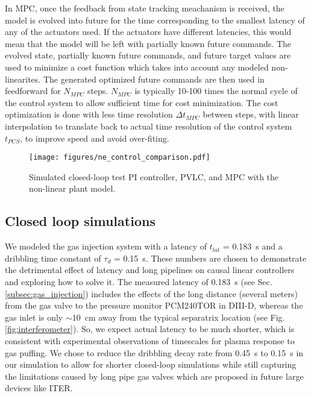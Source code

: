 In \ac{MPC}, once the feedback from state tracking meachanism is received, the model is evolved into future for the time corresponding to the smallest latency of any of the actuators used. If the actuators have different latencies, this would mean that the model will be left with partially known future commands. The evolved state, partially known future commands, and future target values are used to minimize a cost function which takes into account any modeled non-linearites. The generated optimized future commands are then used in feedforward for $N_{MPC}$ steps. $N_{MPC}$ is typically 10-100 times the normal cycle of the control system to allow sufficient time for cost minimization. The cost optimization is done with less time resolution $\Delta t_{MPC}$ between steps, with linear interpolation to translate back to actual time resolution of the control system $t_{PCS}$, to improve speed and avoid over-fiting.


\begin{figure}[!h]
 \centering
 \texttt{[image: figures/ne\_control\_comparison.pdf]}
 \caption{Simulated closed-loop test PI controller, \ac{PVLC}, and \ac{MPC} with the non-linear plant model.}
 \label{fig:mpc_test}
\end{figure}

\subsection{Closed loop simulations}{\label{subssec:closed-loop_sims}}

We modeled the gas injection system with a latency of $t_{lat}$ = 0.183~s and a dribbling time constant of $\tau_d$ = 0.15~s. These numbers are chosen to demonstrate the detrimental effect of latency and long pipelines on causal linear controllers and exploring how to solve it. The measured latency of 0.183~s (see Sec.\ref{subsec:gas_injection}) includes the effects of the long distance (several meters) from the gas valve to the pressure monitor PCM240TOR in DIII-D, whereas the gas inlet is only $\sim10$~cm away from the typical separatrix location (see Fig.\ref{fig:interferometer}). So, we expect actual latency to be much shorter, which is consistent with experimental observations of timescales for plasma response to gas puffing. We chose to reduce the dribbling decay rate from 0.45~s to 0.15~s in our simulation to allow for shorter closed-loop simulations while still capturing the limitations caused by long pipe gas valves which are proposed in future large devices like ITER\cite{holtkap_2007_fed}. 

